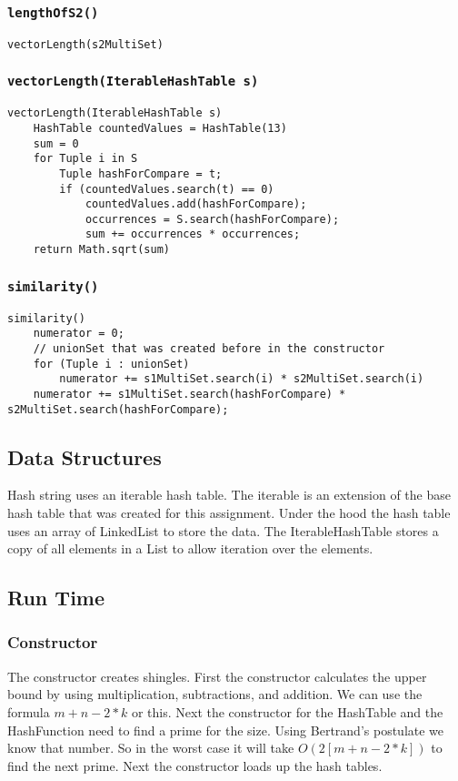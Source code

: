 \documentclass[10pt,letterpaper]{article}
\begin{document}
\subsubsection{\texttt{lengthOfS2()}}
\begin{verbatim}
vectorLength(s2MultiSet)
\end{verbatim}
\subsubsection{\texttt{vectorLength(IterableHashTable s)}}
\begin{verbatim}
vectorLength(IterableHashTable s)
    HashTable countedValues = HashTable(13)
    sum = 0
    for Tuple i in S
        Tuple hashForCompare = t;
        if (countedValues.search(t) == 0)
            countedValues.add(hashForCompare);
            occurrences = S.search(hashForCompare);
            sum += occurrences * occurrences;
    return Math.sqrt(sum)
\end{verbatim}
\subsubsection{\texttt{similarity()}}
\begin{verbatim}
similarity()
    numerator = 0;
    // unionSet that was created before in the constructor
    for (Tuple i : unionSet)
        numerator += s1MultiSet.search(i) * s2MultiSet.search(i)
    numerator += s1MultiSet.search(hashForCompare) * s2MultiSet.search(hashForCompare);
\end{verbatim}
\subsection{Data Structures}
Hash string uses an iterable hash table. The iterable is an extension of the base hash table that was created for this
assignment. Under the hood the hash table uses an array of LinkedList to store the data. The IterableHashTable stores
a copy of all elements in a List to allow iteration over the elements.
\subsection{Run Time}
\subsubsection{Constructor}
The constructor creates shingles. First the constructor calculates the upper bound by using multiplication, subtractions, and addition. We can use the formula $m + n -2 * k$ or this.
Next the constructor for the HashTable and the HashFunction need to find a prime for the size. Using Bertrand's postulate we know that number. So in the worst case it will take
 $O(2[m + n -2 * k])$ to find the next prime. Next the constructor loads up the hash tables.
\end{document}
